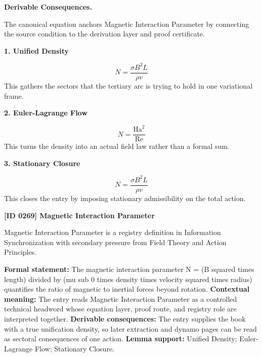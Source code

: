\par\vspace{0.35em}
\noindent\textbf{Derivable Consequences.}\quad
\begingroup
\footnotesize
\raggedright
The canonical equation anchors Magnetic Interaction Parameter by connecting the source condition to the derivation layer and proof certificate.
\par\endgroup

\noindent\textbf{1. Unified Density}\par
\[
N=\frac{\sigma B^2L}{\rho v}
\]
\noindent This gathers the sectors that the tertiary arc is trying to hold in one variational frame.\par
\noindent\textbf{2. Euler-Lagrange Flow}\par
\[
N=\frac{\mathrm{Ha}^2}{\mathrm{Re}}
\]
\noindent This turns the density into an actual field law rather than a formal sum.\par
\noindent\textbf{3. Stationary Closure}\par
\[
N=\frac{\sigma B^2L}{\rho v}
\]
\noindent This closes the entry by imposing stationary admissibility on the total action.\par

\clearpage
\noindent\textbf{[ID 0269] Magnetic Interaction Parameter}\par
\vspace{0.35em}
\begingroup\small
{}
Magnetic Interaction Parameter is a registry definition in Information Synchronization with secondary pressure from Field Theory and Action Principles.

\begingroup\footnotesize\setlength{\emergencystretch}{3em}\sloppy
\textbf{Formal statement:} The magnetic interaction parameter N = (B squared times length) divided by (mu sub 0 times density times velocity squared times radius) quantifies the ratio of magnetic to inertial forces beyond rotation. \textbf{Contextual meaning:} The entry reads Magnetic Interaction Parameter as a controlled technical headword whose equation layer, proof route, and registry role are interpreted together. \textbf{Derivable consequences:} The entry supplies the book with a true unification density, so later extraction and dynamo pages can be read as sectoral consequences of one action. \textbf{Lemma support:} Unified Density; Euler-Lagrange Flow; Stationary Closure.\par
\endgroup

